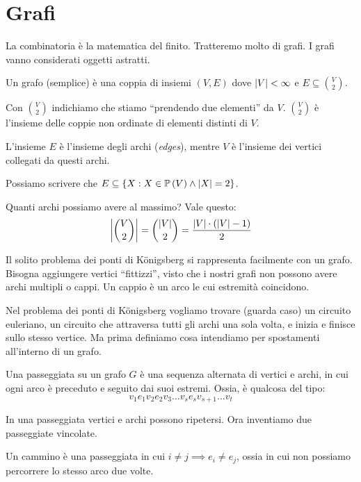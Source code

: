 
\chapter{Grafi}

La combinatoria \`e la matematica del finito.
Tratteremo molto di grafi.
I grafi vanno considerati oggetti astratti.

\begin{defn}[Grafo]
	Un grafo (semplice) \`e una coppia di insiemi $(V,E)$ dove $\left\lvert{V}\right\rvert < \infty$ e $E \subseteq \binom{V}{2}$.
\end{defn}
Con $\binom{V}{2}$ indichiamo che stiamo ``prendendo due elementi'' da $V$.
$\binom{V}{2}$ \`e l'insieme delle coppie non ordinate di elementi distinti di $V$.

L'insieme $E$ \`e l'insieme degli archi (\emph{edges}), mentre $V$ \`e l'insieme dei vertici collegati da questi archi.

Possiamo scrivere che $E \subseteq \{ X : X \in \mathbb{P} \left( {V} \right) \land \left\lvert{X}\right\rvert = 2 \}$.

Quanti archi possiamo avere al massimo?
Vale questo:
\[
\left\lvert{\binom{V}{2}}\right\rvert = \binom{\left\lvert{V}\right\rvert}{2} = \frac{\left\lvert{V}\right\rvert \cdot \left( \left\lvert{V}\right\rvert - 1 \right)}{2}
\]

Il solito problema dei ponti di K\"onigsberg si rappresenta facilmente con un grafo.
Bisogna aggiungere vertici ``fittizzi'', visto che i nostri grafi non possono avere archi multipli o cappi.
Un cappio \`e un arco le cui estremit\`a coincidono.

Nel problema dei ponti di K\"onigsberg vogliamo trovare (guarda caso) un circuito euleriano, un circuito che attraversa tutti gli archi una sola volta, e inizia e finisce sullo stesso vertice.
Ma prima definiamo cosa intendiamo per spostamenti all'interno di un grafo.

\begin{defn}
	Una passeggiata su un grafo $G$ \`e una sequenza alternata di vertici e archi, in cui ogni arco \`e preceduto e seguito dai suoi estremi.
	Ossia, \`e qualcosa del tipo:
	\[
		v_1 e_1 v_2 e_2 v_3 \dots v_s e_s v_{s+1} \dots v_t
	\]
\end{defn}
In una passeggiata vertici e archi possono ripetersi.
Ora inventiamo due passeggiate vincolate.

\begin{defn}
	Un cammino \`e una passeggiata in cui $i \neq j \implies e_i \neq e_j$, ossia in cui non possiamo percorrere lo stesso arco due volte.
\end{defn}

